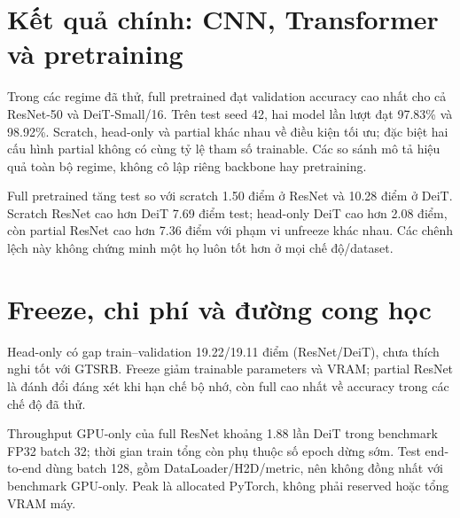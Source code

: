 \section{Kết quả chính: CNN, Transformer và pretraining}
Trong các regime đã thử, full pretrained đạt validation accuracy cao nhất
cho cả ResNet-50 và DeiT-Small/16. Trên test seed 42, hai model lần lượt đạt
97.83\% và 98.92\%. Scratch, head-only và partial khác nhau về điều kiện tối ưu;
đặc biệt hai cấu hình partial không có cùng tỷ lệ tham số trainable. Các so sánh
mô tả hiệu quả toàn bộ regime, không cô lập riêng backbone hay pretraining.

Full pretrained tăng test so với scratch 1.50 điểm ở ResNet và 10.28 điểm
ở DeiT. Scratch ResNet cao hơn DeiT 7.69 điểm test; head-only DeiT cao hơn
2.08 điểm, còn partial ResNet cao hơn 7.36 điểm với phạm vi unfreeze khác nhau.
Các chênh lệch này không chứng minh một họ luôn tốt hơn ở mọi chế độ/dataset.

\section{Freeze, chi phí và đường cong học}
Head-only có gap train--validation 19.22/19.11 điểm (ResNet/DeiT),
chưa thích nghi tốt với GTSRB. Freeze giảm trainable parameters và VRAM;
partial ResNet là đánh đổi đáng xét khi hạn chế bộ nhớ, còn full cao nhất
về accuracy trong các chế độ đã thử.

Throughput GPU-only của full ResNet khoảng 1.88 lần DeiT trong benchmark
FP32 batch 32; thời gian train tổng còn phụ thuộc số epoch dừng sớm.
Test end-to-end dùng batch 128, gồm DataLoader/H2D/metric, nên không đồng nhất
với benchmark GPU-only. Peak là allocated PyTorch, không phải reserved
hoặc tổng VRAM máy.


